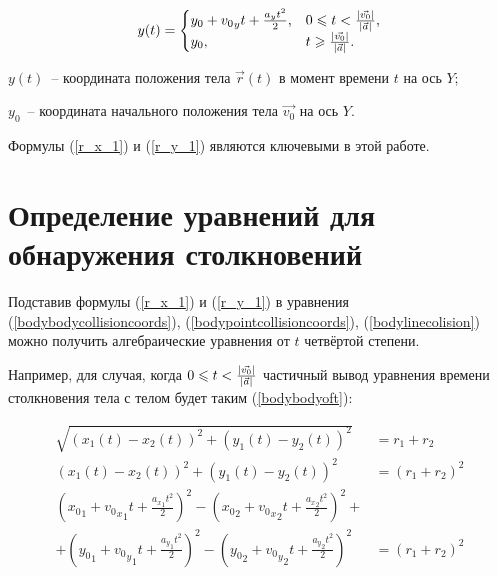 \begin{equation}\label{r_y_1}
  y(t) =
  \begin{cases}
    y_0 + {v_0}_y t + \frac{a_y t^2}{2}, & 0 \leqslant t < \frac{\left|\vec{v_0}\right|}{\left|\vec{a}\right|}, \\
    y_0,                                 & t \geqslant \frac{\left|\vec{v_0}\right|}{\left|\vec{a}\right|}.
  \end{cases}
\end{equation}

\begin{Underequation}
  \(y(t)\)~-- координата положения тела \(\vec{r}(t)\) в момент времени \(t\) на ось \(Y\);

  \(y_0\)~-- координата начального положения тела \(\vec{v_0}\) на ось \(Y\).
\end{Underequation}

Формулы (\ref{r_x_1}) и (\ref{r_y_1}) являются ключевыми в этой работе. \TODO

\section{Определение уравнений для обнаружения столкновений}

Подставив формулы (\ref{r_x_1}) и (\ref{r_y_1}) в уравнения
(\ref{bodybodycollisioncoords}), (\ref{bodypointcollisioncoords}), (\ref{bodylinecolision})
можно получить алгебраические уравнения от \(t\) четвёртой степени.

Например, для случая, когда \(0 \leqslant t < \frac{\left|\vec{v_0}\right|}{\left|\vec{a}\right|}\) частичный вывод уравнения времени столкновения тела с телом будет таким (\ref{bodybodyoft}):

\begin{align}\label{bodybodyoft}
  \sqrt{(x_1(t) - x_2(t))^2 + (y_1(t) - y_2(t))^2}        & = r_1 + r_2 \nonumber     \\
  (x_1(t) - x_2(t))^2 + (y_1(t) - y_2(t))^2               & = (r_1 + r_2)^2 \nonumber \\
  ({x_0}_1 + {{v_0}_x}_1 t + \frac{{a_x}_1 t^2}{2})^2
  - ({x_0}_2 + {{v_0}_x}_2 t + \frac{{a_x}_2 t^2}{2})^2 + & \nonumber                 \\
  + ({y_0}_1 + {{v_0}_y}_1 t + \frac{{a_y}_1 t^2}{2})^2
  - ({y_0}_2 + {{v_0}_y}_2 t + \frac{{a_y}_2 t^2}{2})^2   & = (r_1 + r_2)^2
\end{align}

